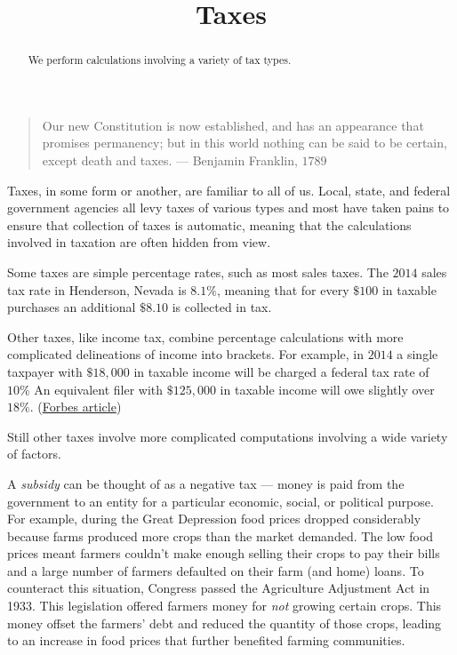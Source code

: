 \documentclass{ximera}
\title{Taxes}
\begin{document}
\begin{abstract}
We perform calculations involving a variety of tax types.
\end{abstract}
\maketitle
\begin{quote}
Our new Constitution is now established, and has an appearance that promises permanency; but in this world nothing can be said to be certain, except death and taxes. --- Benjamin Franklin, $1789$
\end{quote}

Taxes, in some form or another, are familiar to all of us. Local, state, and federal government agencies all levy taxes of various types and most have taken pains to ensure that collection of taxes is automatic, meaning that the calculations involved in taxation are often hidden from view.

Some taxes are simple percentage rates, such as most sales taxes. The $2014$ sales tax rate in Henderson, Nevada is $8.1\%$, meaning that for every $\$100$ in taxable purchases an additional $\$8.10$ is collected in tax.

Other taxes, like income tax, combine percentage calculations with more complicated delineations of income into brackets. For example, in $2014$ a single taxpayer with $\$18,000$ in taxable income will be charged a federal tax rate of $10\%$ An equivalent filer with $\$125,000$ in taxable income will owe slightly over $18\%$. (\href{http://www.forbes.com/sites/kellyphillipserb/2013/10/31/irs-announces-2014-tax-brackets-standard-deduction-amounts-and-more/}{Forbes article})

Still other taxes involve more complicated computations involving a wide variety of factors. 

A \emph{subsidy} can be thought of as a negative tax --- money is paid from the government to an entity for a particular economic, social, or political purpose. For example, during the Great Depression food prices dropped considerably because farms produced more crops than the market demanded. The low food prices meant farmers couldn't make enough selling their crops to pay their bills and a large number of farmers defaulted on their farm (and home) loans. To counteract this situation, Congress passed the Agriculture Adjustment Act in 1933. This legislation offered farmers money for \emph{not} growing certain crops. This money offset the farmers' debt and reduced the quantity of those crops, leading to an increase in food prices that further benefited farming communities.
\end{document}
